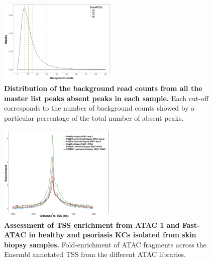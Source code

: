 \begin{figure}[htbp]
\centering
\includegraphics[width=0.5\textwidth]{./Appendix/pdfs/Chapter3/ATAC_absent_peaks_noise_distribution}
\caption[Distribution of the background read counts from all the master list peaks absent in each sample.]{\textbf{Distribution of the background read counts from all the master list peaks absent peaks in each sample.} Each cut-off corresponds to the number of background counts showed by a particular percentage of the total number of absent peaks.}
\label{figure:ATAC_absent_peaks_distribution}
\end{figure}



\begin{figure}[htbp]
\centering
\includegraphics[width=0.5\textwidth]{./Appendix/pdfs/Chapter3/ATAC_skin_biopsy_samples_all_methods_TSS_enrichment_supplementary}
\caption[Assessment of TSS enrichment from ATAC 1 and Fast-ATAC in healthy and psoriasis KCs isolated from skin biopsy samples.]{\textbf{Assessment of TSS enrichment from ATAC 1 and Fast-ATAC in healthy and psoriasis KCs isolated from skin biopsy samples.} Fold-enrichment of ATAC fragments across the Ensembl annotated TSS from the different ATAC libraries.}
\label{figure:TSS_skin_biopsies}
\end{figure}



